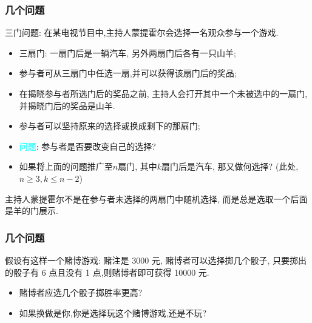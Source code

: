\begin{frame}
	\frametitle{几个问题}
	\begin{prob}三门问题: 在某电视节目中,主持人蒙提霍尔会选择一名观众参与一个游戏.
		\begin{itemize}[<+-|alert@+>]
			\item 三扇门: 一扇门后是一辆汽车, 另外两扇门后各有一只山羊;
			\item 参与者可从三扇门中任选一扇,并可以获得该扇门后的奖品;
			\item 在揭晓参与者所选门后的奖品之前, 主持人会打开其中一个未被选中的一扇门,并揭晓门后的奖品是山羊.

			\item 参与者可以坚持原来的选择或换成剩下的那扇门;
			\item  \textcolor{cyan}{问题}: 参与者是否要改变自己的选择?

			\item 如果将上面的问题推广至$n$扇门, 其中$k$扇门后是汽车, 那又做何选择? (此处, $n\geq 3, k\leq n-2$)
		\end{itemize}

	\end{prob}
	\pause
	\begin{rmk}
		主持人蒙提霍尔不是在参与者未选择的两扇门中随机选择, 而是总是选取一个后面是羊的门展示.
	\end{rmk}

\end{frame}


\begin{frame}
	\frametitle{几个问题}
	\begin{prob}
		假设有这样一个赌博游戏: 赌注是 3000 元, 赌博者可以选择掷几个骰子, 只要掷出的骰子有 6 点且没有 1 点,则赌博者即可获得 10000 元.
		\begin{itemize}[<+-|alert@+>]
			\item 赌博者应选几个骰子掷胜率更高?

			\item 如果换做是你,你是选择玩这个赌博游戏,还是不玩?
		\end{itemize}
	\end{prob}


\end{frame}

